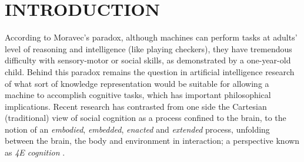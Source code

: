 \documentclass[letterpaper, 10 pt, conference]{ieeeconf}  %
\begin{document}
\begin{abstract}
		
	\end{abstract}
	
	
	\section{INTRODUCTION}
	
	According to Moravec's paradox, although machines can perform tasks at adults' level of reasoning and intelligence (like playing checkers), they have tremendous difficulty with sensory-motor or social skills, as demonstrated by a one-year-old child. Behind this paradox remains the question in artificial intelligence research of what sort of knowledge representation would be suitable for allowing a machine to accomplish cognitive tasks, which has important philosophical implications. Recent research has contrasted from one side the Cartesian (traditional) view of social cognition as a process confined to the brain, to the notion of an \textit{embodied}, \textit{embedded}, \textit{enacted} and \textit{extended} process, unfolding between the brain, the body and environment in interaction; a perspective known as \textit{4E cognition} \cite{Newen2018}.      
	
\end{document}
